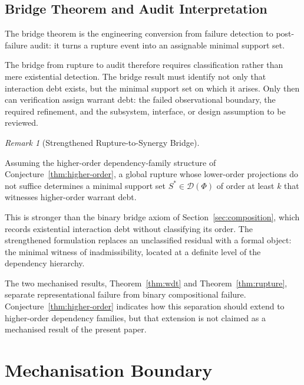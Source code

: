 \documentclass[pdflatex,sn-mathphys-num]{sn-jnl}
\theoremstyle{plain}
\theoremstyle{definition}
\theoremstyle{remark}
\newtheorem{remark}[theorem]{Remark}
\begin{document}
\subsection{Bridge Theorem and Audit Interpretation}
\label{subsec:bridge}

The bridge theorem is the engineering conversion from failure detection
to post-failure audit: it turns a rupture event into an assignable
minimal support set.

The bridge from rupture to audit therefore requires classification
rather than mere existential detection.
The bridge result must identify not only that interaction debt exists,
but the minimal support set on which it arises.
Only then can verification assign warrant debt: the failed
observational boundary, the required refinement, and the subsystem,
interface, or design assumption to be reviewed.

\begin{remark}[Strengthened Rupture-to-Synergy Bridge]
\label{cor:bridge}

Assuming the higher-order dependency-family structure of
Conjecture~\ref{thm:higher-order}, a global rupture whose lower-order
projections do not suffice determines a minimal support set
$S^* \in \mathcal{D}(\Phi)$ of order at least $k$ that witnesses
higher-order warrant debt.

\end{remark}

This is stronger than the binary bridge axiom of
Section~\ref{sec:composition}, which records existential interaction
debt without classifying its order.
The strengthened formulation replaces an unclassified residual with a
formal object: the minimal witness of inadmissibility, located at a
definite level of the dependency hierarchy.

The two mechanised results, Theorem~\ref{thm:wdt} and
Theorem~\ref{thm:rupture}, separate representational failure from
binary compositional failure.
Conjecture~\ref{thm:higher-order} indicates how this separation should
extend to higher-order dependency families, but that extension is not
claimed as a mechanised result of the present paper.

\section{Mechanisation Boundary}
\label{sec:boundary}
\end{document}
